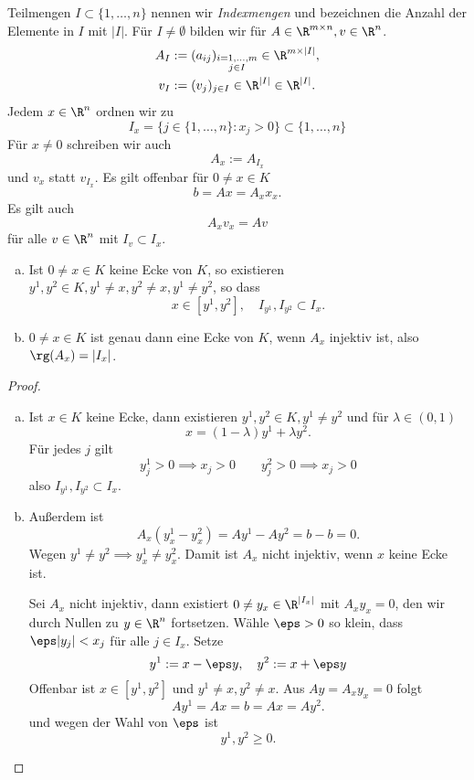 \begin{df} \label{3.5}
	Teilmengen $I \subset \{1, \dotsc, n\}$ nennen wir \emph{Indexmengen} und bezeichnen die Anzahl der Elemente in $I$ mit $|I|$.
	Für $I \neq \emptyset$ bilden wir für $A \in \R^{m\times n}, v \in \R^n$.
	\begin{align*}
		A_I &:= (a_{ij})_{\substack{i=1,\dotsc,m \\ j \in I}}
			\in \R^{m\times |I|}, \\
		v_I &:= (v_j)_{j\in I} \in \R^{|I|}
			\in \R^{|I|}.
	\end{align*}
	Jedem $x \in \R^n$ ordnen wir zu
	\[
		I_x = \Big\{ j \in \{1, \dotsc, n\} : x_j > 0 \Big\}
		\subset \{1, \dotsc, n\}
	\]
	Für $x \neq 0$ schreiben wir auch
	\[
		A_x := A_{I_x}
	\]
	und $v_x$ statt $v_{I_x}$.
	Es gilt offenbar für $0 \neq x \in K$
	\[
		b = Ax = A_x x_x.
	\]
	Es gilt auch
	\[
		A_x v_x = A v
	\]
	für alle $v \in \R^n$ mit $I_v \subset I_x$.
\end{df}

\begin{lem} \label{3.6}
	\begin{enumerate}[(a)]
		\item
			Ist $0 \neq x \in K$ keine Ecke von $K$, so existieren $y^1, y^2 \in K, y^1 \neq x, y^2 \neq x, y^1 \neq y^2$, so dass
			\[
				x \in [y^1, y^2], \quad I_{y^1}, I_{y^2} \subset I_x.
			\]
		\item
			$0 \neq x \in K$ ist genau dann eine Ecke von $K$, wenn $A_x$ injektiv ist, also $\rg(A_x) = |I_x|$.
	\end{enumerate}
	\begin{proof}
		\begin{enumerate}[(a)]
			\item
				Ist $x \in K$ keine Ecke, dann existieren $y^1, y^2 \in K, y^1 \neq y^2$ und für $\lambda \in (0,1)$
				\[
					x = (1-\lambda) y^1 + \lambda y^2.
				\]
				Für jedes $j$ gilt
				\[
					y_j^1 > 0 \implies x_j > 0 \qquad
					y_j^2 > 0 \implies x_j > 0
				\]
				also $I_{y^1}, I_{y^2} \subset I_x$.
			\item
				Außerdem ist
				\[
					A_x (y_x^1 - y_x^2)
					= Ay^1 - Ay^2
					= b - b = 0.
				\]
				Wegen $y^1 \neq y^2 \implies y_x^1 \neq  y_x^2$.
				Damit ist $A_x$ nicht injektiv, wenn $x$ keine Ecke ist.

				Sei $A_x$ nicht injektiv, dann existiert $0 \neq y_x \in \R^{|I_x|}$ mit $A_x y_x = 0$, den wir durch Nullen zu $y \in \R^n$ fortsetzen.
				Wähle $\eps > 0$ so klein, dass $\eps |y_j| < x_j$ für alle $j \in I_x$.
				Setze
				\[
					y^1 := x - \eps y,
					\quad
					y^2 := x + \eps y
				\]
				Offenbar ist $x \in [y^1, y^2]$ und $y^1 \neq x, y^2 \neq x$.
				Aus $Ay = A_x y_x = 0$ folgt
				\[
					Ay^1 = Ax = b = Ax = Ay^2.
				\]
				und wegen der Wahl von $\eps$ ist
				\[
					y^1, y^2 \ge 0.
				\]
		\end{enumerate}
	\end{proof}
\end{lem}
